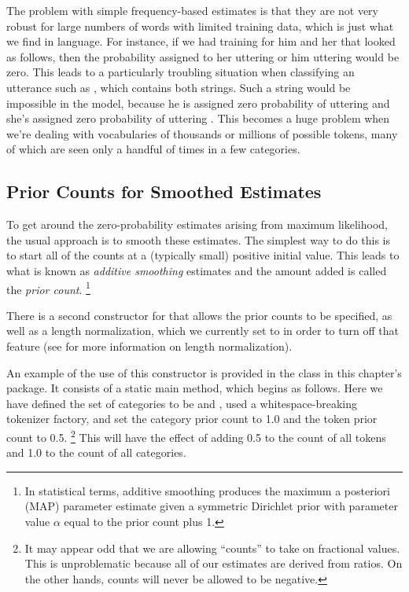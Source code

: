 The problem with simple frequency-based estimates is that they are not
very robust for large numbers of words with limited training data,
which is just what we find in language.  For instance, if we had
training for him and her that looked as follows,
%
%
then the probability assigned to her uttering  or
him uttering  would be zero.  This leads to a
particularly troubling situation when classifying an utterance such as
, which contains both strings.  Such a
string would be impossible in the model, because he is assigned zero
probability of uttering  and she's assigned zero
probability of uttering .  This becomes a huge problem
when we're dealing with vocabularies of thousands or millions of 
possible tokens, many of which are seen only a handful of times in
a few categories.  

\subsection{Prior Counts for Smoothed Estimates}

To get around the zero-probability estimates arising from maximum
likelihood, the usual approach is to smooth these estimates.  The
simplest way to do this is to start all of the counts at a (typically
small) positive initial value.  This leads to what is known as {\it
  additive smoothing} estimates and the amount added is
called the {\it prior count}.%
%
\footnote{In statistical terms, additive smoothing produces the
  maximum a posteriori (MAP) parameter estimate given a symmetric
  Dirichlet prior with parameter value $\alpha$ equal to the prior
  count plus 1.}
%

There is a second constructor for  that
allows the prior counts to be specified, as well as a length normalization,
which we currently set to  in order to turn off that
feature (see  for more information on
length normalization).  

An example of the use of this constructor is provided in the
class  in this chapter's package.  It consists
of a static main method, which begins as follows.
%
%
Here we have defined the set of categories to be 
and , used a whitespace-breaking tokenizer
factory, and set the category prior count to 1.0 and the token prior
count to 0.5.%
%
\footnote{It may appear odd that we are allowing ``counts'' to take on
  fractional values.  This is unproblematic because all of our
  estimates are derived from ratios.  On the other hands, counts will
  never be allowed to be negative.}
%
This will have the effect of adding 0.5 to the count of all tokens and
1.0 to the count of all categories.

